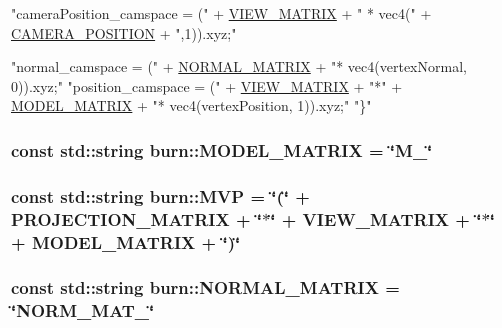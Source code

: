 \begin{DoxyCode}
            \textcolor{stringliteral}{"cameraPosition\_camspace = ("} + \hyperlink{namespaceburn_a7cb7c6572d4f7796ea3e5edae85e51f1}{VIEW\_MATRIX} + \textcolor{stringliteral}{" * vec4("} + 
      \hyperlink{namespaceburn_aea213969ba83f20b14023eac83ce7f04}{CAMERA\_POSITION} + \textcolor{stringliteral}{",1)).xyz;"}

            \textcolor{stringliteral}{"normal\_camspace = ("} + \hyperlink{namespaceburn_a4daeaa4edb8bd22d9f48786640972b3a}{NORMAL\_MATRIX} + \textcolor{stringliteral}{"* vec4(vertexNormal, 0)).xyz;"}
            \textcolor{stringliteral}{"position\_camspace = ("} + \hyperlink{namespaceburn_a7cb7c6572d4f7796ea3e5edae85e51f1}{VIEW\_MATRIX} + \textcolor{stringliteral}{"*"} + 
      \hyperlink{namespaceburn_aef2bc91c4c84fa143da611ee2f284c8b}{MODEL\_MATRIX} + \textcolor{stringliteral}{"* vec4(vertexPosition, 1)).xyz;"}
        \textcolor{stringliteral}{"\}"}
\end{DoxyCode}
\hypertarget{namespaceburn_aef2bc91c4c84fa143da611ee2f284c8b}{
\subsubsection[{M\-O\-D\-E\-L\-\_\-\-M\-A\-T\-R\-I\-X}]{\setlength{\rightskip}{0pt plus 5cm}const std\-::string burn\-::\-M\-O\-D\-E\-L\-\_\-\-M\-A\-T\-R\-I\-X = \char`\"{}M\-\_\-\char`\"{}}}\label{namespaceburn_aef2bc91c4c84fa143da611ee2f284c8b}
\hypertarget{namespaceburn_a7c71b053f299e14c880f0f11ba916a44}{
\subsubsection[{M\-V\-P}]{\setlength{\rightskip}{0pt plus 5cm}const std\-::string burn\-::\-M\-V\-P = \char`\"{}(\char`\"{} + {\bf P\-R\-O\-J\-E\-C\-T\-I\-O\-N\-\_\-\-M\-A\-T\-R\-I\-X} + \char`\"{}$\ast$\char`\"{} + {\bf V\-I\-E\-W\-\_\-\-M\-A\-T\-R\-I\-X} + \char`\"{}$\ast$\char`\"{} + {\bf M\-O\-D\-E\-L\-\_\-\-M\-A\-T\-R\-I\-X} + \char`\"{})\char`\"{}}}\label{namespaceburn_a7c71b053f299e14c880f0f11ba916a44}
\hypertarget{namespaceburn_a4daeaa4edb8bd22d9f48786640972b3a}{
\subsubsection[{N\-O\-R\-M\-A\-L\-\_\-\-M\-A\-T\-R\-I\-X}]{\setlength{\rightskip}{0pt plus 5cm}const std\-::string burn\-::\-N\-O\-R\-M\-A\-L\-\_\-\-M\-A\-T\-R\-I\-X = \char`\"{}N\-O\-R\-M\-\_\-\-M\-A\-T\-\_\-\char`\"{}}}\label{namespaceburn_a4daeaa4edb8bd22d9f48786640972b3a}
